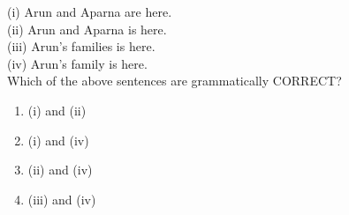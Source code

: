 \item (i) Arun and Aparna are here.\\
(ii) Arun and Aparna is here.\\
(iii) Arun's families is here.\\
(iv) Arun's family is here.\\
Which of the above sentences are grammatically CORRECT?
\begin{multicols}{2}
    \begin{enumerate}
        \item (i) and (ii)
        \item (i) and (iv)
        \item (ii) and (iv)
        \item (iii) and (iv)
    \end{enumerate}
\end{multicols}

